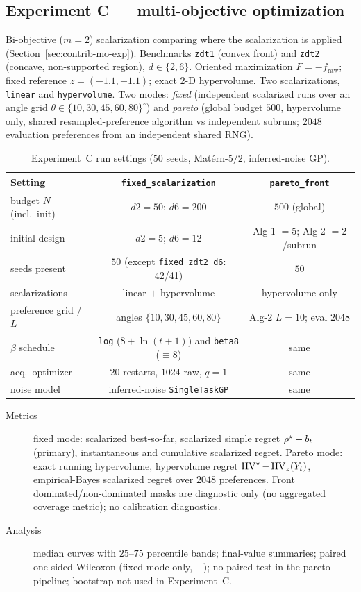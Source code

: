 \subsection{Experiment C --- multi-objective optimization}

Bi-objective ($m=2$) scalarization comparing where the scalarization is applied
(Section~\ref{sec:contrib-mo-exp}). Benchmarks \texttt{zdt1} (convex front) and
\texttt{zdt2} (concave, non-supported region), $d\in\{2,6\}$. Oriented
maximization $F=-f_{\mathrm{raw}}$; fixed reference $z=(-1.1,-1.1)$; exact 2-D
hypervolume. Two scalarizations, \texttt{linear} and \texttt{hypervolume}. Two
modes: \emph{fixed} (independent scalarized runs over an angle grid
$\theta\in\{10,30,45,60,80\}^\circ$) and \emph{pareto} (global budget $500$,
hypervolume only, shared resampled-preference algorithm vs independent subruns;
$2048$ evaluation preferences from an independent shared RNG).

\begin{table}[htbp]\centering\small
\caption{Experiment~C run settings ($50$ seeds, Mat\'ern-$5/2$, inferred-noise GP).}
\label{tab:expC}
\begin{tabular}{@{}lcc@{}}
\toprule
Setting & \texttt{fixed\_scalarization} & \texttt{pareto\_front} \\
\midrule
budget $N$ (incl.\ init) & $d2{=}50$; $d6{=}200$ & $500$ (global) \\
initial design & $d2{=}5$; $d6{=}12$ & Alg-1 $=5$; Alg-2 $=2$/subrun \\
seeds present & $50$ (except \texttt{fixed\_zdt2\_d6}: 42/41) & $50$ \\
scalarizations & linear $+$ hypervolume & hypervolume only \\
preference grid / $L$ & angles $\{10,30,45,60,80\}$ & Alg-2 $L{=}10$; eval $2048$ \\
$\beta$ schedule & \texttt{log} ($8{+}\ln(t{+}1)$) and \texttt{beta8} ($\equiv8$) & same \\
acq.\ optimizer & $20$ restarts, $1024$ raw, $q{=}1$ & same \\
noise model & inferred-noise \texttt{SingleTaskGP} & same \\
\bottomrule
\end{tabular}
\end{table}

\begin{description}
  \item[Metrics] fixed mode: scalarized best-so-far, scalarized simple regret
        $\rho^\star-b_t$ (primary), instantaneous and cumulative scalarized
        regret. Pareto mode: exact running hypervolume, hypervolume regret
        $\operatorname{HV}^\star-\operatorname{HV}_z(Y_t)$, empirical-Bayes scalarized regret over $2048$
        preferences. Front dominated/non-dominated masks are diagnostic only (no
        aggregated coverage metric); no calibration diagnostics.
  \item[Analysis] median curves with $25$--$75$ percentile bands; final-value
        summaries; paired one-sided Wilcoxon (fixed mode only, \WRONG$-$\RIGHT);
        no paired test in the pareto pipeline; bootstrap not used in
        Experiment~C.
\end{description}



